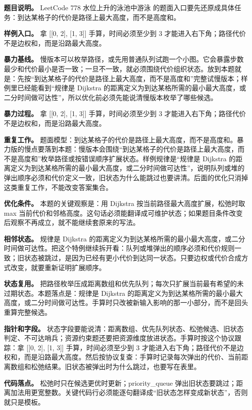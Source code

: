 \textbf{题目说明。} LeetCode 778 水位上升的泳池中游泳 的题面入口要先还原成具体任务：到达某格子的代价是路径上最大高度，而不是高度和。

\textbf{样例入口。} 拿 [[0, 2], [1, 3]] 手算，时间必须至少到 3 才能进入右下角；路径代价不是边权和，而是沿路最大高度。

\textbf{暴力基线。} 慢版本可以枚举路径，或先用普通队列试跑一个小图。它会暴露步数最少和代价最小是否一致；一旦不一致，就必须围绕代价组织状态。放到本题就是：先按“到达某格子的代价是路径上最大高度，而不是高度和”完整试慢版本；样例里已经能看到“规律是 Dijkstra 的距离定义为到达某格所需的最小最大高度，或二分时间做可达性”，所以优化前必须先能说清慢版本枚举了哪些候选。

\textbf{暴力过程。} 拿 [[0, 2], [1, 3]] 手算，时间必须至少到 3 才能进入右下角；路径代价不是边权和，而是沿路最大高度。

\textbf{重复工作。} 题面模型：到达某格子的代价是路径上最大高度，而不是高度和。暴力版的慢点要落到本题：慢版本会围绕“到达某格子的代价是路径上最大高度，而不是高度和”枚举路径或按错误顺序扩展状态。样例规律是“规律是 Dijkstra 的距离定义为到达某格所需的最小最大高度，或二分时间做可达性”，说明队列或堆的弹出顺序必须和代价定义一致，旧状态为什么能跳过也要讲清。后面的优化只消掉这类重复工作，不能改变答案集合。

\textbf{优化条件。} 本题的关键观察是：用 Dijkstra 按当前路径最大高度扩展，松弛时取 max 当前代价和邻格高度。这句话必须能翻译成可维护状态；如果题目条件改变后观察不再成立，就不能继续套原来的写法。

\textbf{相邻状态。} 规律是 Dijkstra 的距离定义为到达某格所需的最小最大高度，或二分时间做可达性。把这个特例继续拆开看：队列或堆弹出的顺序必须和代价规则一致；旧状态被跳过，是因为已经有更小代价到达同一状态。只要边权或代价合成方式改变，就要重新证明扩展顺序。

\textbf{状态复用。} 把路径枚举压成距离数组和优先队列；每次只扩展当前最有希望的未过期状态。本题落点是：规律是 Dijkstra 的距离定义为到达某格所需的最小最大高度，或二分时间做可达性。手算时只改被新输入影响的那一小部分，而不是回头重算完整候选。

\textbf{指针和字段。} 状态字段要能说清：距离数组、优先队列状态、松弛候选、旧状态判定、不可达哨兵；资源约束题还要把资源维度放进状态。手算时按这个协议跟踪：拿 [[0, 2], [1, 3]] 手算，时间必须至少到 3 才能进入右下角；路径代价不是边权和，而是沿路最大高度。然后按协议复查：手算时记录每次弹出的代价、当前距离数组和松弛结果。旧状态被弹出时为什么跳过，也要写在表里。

\textbf{代码落点。} 松弛时只在候选更优时更新；priority\_queue 弹出旧状态要跳过；距离加法用更宽整数。关键代码行必须能逐句翻译成“旧状态怎样变成新状态”，否则就只是模板。

